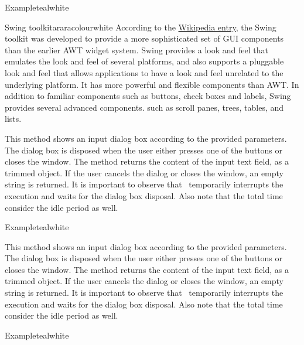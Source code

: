 \begin{description}
\begin{codebox}{Example}{teal}{\icnote}{white}
\end{codebox}

\begin{messagebox}{Swing toolkit}{araracolour}{\icok}{white}
According to the \href{https://en.wikipedia.org/wiki/Swing_(Java)}{Wikipedia entry}, the Swing toolkit was developed to provide a more sophisticated set of GUI components than the earlier  AWT widget system. Swing provides a look and feel that emulates the look and feel of several platforms, and also supports a pluggable look and feel that allows applications to have a look and feel unrelated to the underlying platform. It has more powerful and flexible components than AWT. In addition to familiar components such as buttons, check boxes and labels, Swing provides several advanced components. such as scroll panes, trees, tables, and lists.
\end{messagebox}

\item[\mddbox{C}{R}{showInput(int width, int icon, String title, String text)}{String}]

This method shows an input dialog box according to the provided parameters. The dialog box is disposed when the user either presses one of the buttons or closes the window. The method returns the content of the input text field, as a trimmed  object. If the user cancels the dialog or closes the window, an empty string is returned. It is important to observe that \arara\ temporarily interrupts the execution and waits for the dialog box disposal. Also note that the total time consider the idle period as well.

\begin{codebox}{Example}{teal}{\icnote}{white}
\end{codebox}

\item[\mddbox{C}{R}{showInput(int icon, String title, String text)}{String}]

This method shows an input dialog box according to the provided parameters. The dialog box is disposed when the user either presses one of the buttons or closes the window. The method returns the content of the input text field, as a trimmed  object. If the user cancels the dialog or closes the window, an empty string is returned. It is important to observe that \arara\ temporarily interrupts the execution and waits for the dialog box disposal. Also note that the total time consider the idle period as well.

\begin{codebox}{Example}{teal}{\icnote}{white}
\end{codebox}
\end{description}

